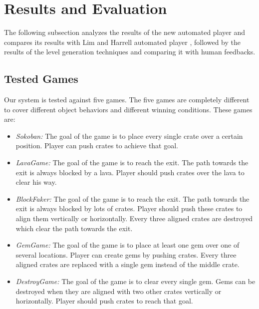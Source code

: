\documentclass[letterpaper]{article}
\begin{document}
\section{Results and Evaluation}
The following subsection analyzes the results of the new automated player and compares its results with Lim and Harrell automated player \cite{puzzleScriptGeneration}, followed by the results of the level generation techniques and comparing it with human feedbacks.

\subsection{Tested Games}
Our system is tested against five games. The five games are completely different to cover different object behaviors and different winning conditions. These games are:
\begin{itemize} \itemsep0pt \parskip0pt 
	\item \emph{Sokoban:} The goal of the game is to place every single crate over a certain position. Player can push crates to achieve that goal.
	\item \emph{LavaGame:} The goal of the game is to reach the exit. The path towards the exit is always blocked by a lava. Player should push crates over the lava to clear his way.
	\item \emph{BlockFaker:} The goal of the game is to reach the exit. The path towards the exit is always blocked by lots of crates. Player should push these crates to align them vertically or horizontally. Every three aligned crates are destroyed which clear the path towards the exit.
	\item \emph{GemGame:} The goal of the game is to place at least one gem over one of several locations. Player can create gems by pushing crates. Every three aligned crates are replaced with a single gem instead of the middle crate.
	\item \emph{DestroyGame:} The goal of the game is to clear every single gem. Gems can be destroyed when they are aligned with two other crates vertically or horizontally. Player should push crates to reach that goal.
\end{itemize}
\end{document}
